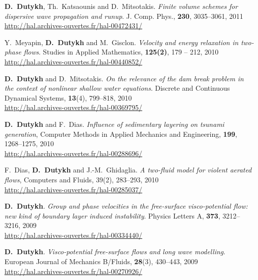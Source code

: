 \begin{etaremune}
  \item \textbf{D.~Dutykh}, Th.~Katsaounis and D.~Mitsotakis. \textit{Finite volume schemes for dispersive wave propagation and runup}. J. Comp. Phys., \textbf{230}, 3035--3061, 2011 \\ %
  \url{http://hal.archives-ouvertes.fr/hal-00472431/}
  
  
  \item Y.~Meyapin, \textbf{D.~Dutykh} and M.~Gisclon. \textit{Velocity and energy relaxation in two-phase flows}. Studies in Applied Mathematics, \textbf{125(2)}, 179 -- 212, 2010 \\ %
  \url{http://hal.archives-ouvertes.fr/hal-00440852/}

  \item \textbf{D.~Dutykh} and D.~Mitsotakis. \textit{On the relevance of the dam break problem in the context of nonlinear shallow water equations}. Discrete and Continuous Dynamical Systems, \textbf{13}(4), 799--818, 2010 \\ %
  \url{http://hal.archives-ouvertes.fr/hal-00369795/}
  
  \item \textbf{D.~Dutykh} and F.~Dias. \textit{Influence of sedimentary layering on tsunami generation}, Computer Methods in Applied Mechanics and Engineering, \textbf{199}, 1268--1275, 2010 \\ %
  \url{http://hal.archives-ouvertes.fr/hal-00288696/}
  
  \item F.~Dias, \textbf{D.~Dutykh} and J.-M.~Ghidaglia. \textit{A two-fluid model for violent aerated flows}, Computers and Fluids, 39(2), 283--293, 2010 \\ %
  \url{http://hal.archives-ouvertes.fr/hal-00285037/}
  
  
  \item \textbf{D.~Dutykh}. \textit{Group and phase velocities in the free-surface visco-potential flow: new kind of boundary layer induced instability}. Physics Letters A, \textbf{373}, 3212--3216, 2009 \\ %
  \url{http://hal.archives-ouvertes.fr/hal-00334440/}
  
  \item \textbf{D.~Dutykh}. \textit{Visco-potential free-surface flows and long wave modelling}. European Journal of Mechanics B/Fluids, \textbf{28}(3), 430--443, 2009 \\ %
  \url{http://hal.archives-ouvertes.fr/hal-00270926/}
  

\end{etaremune}
